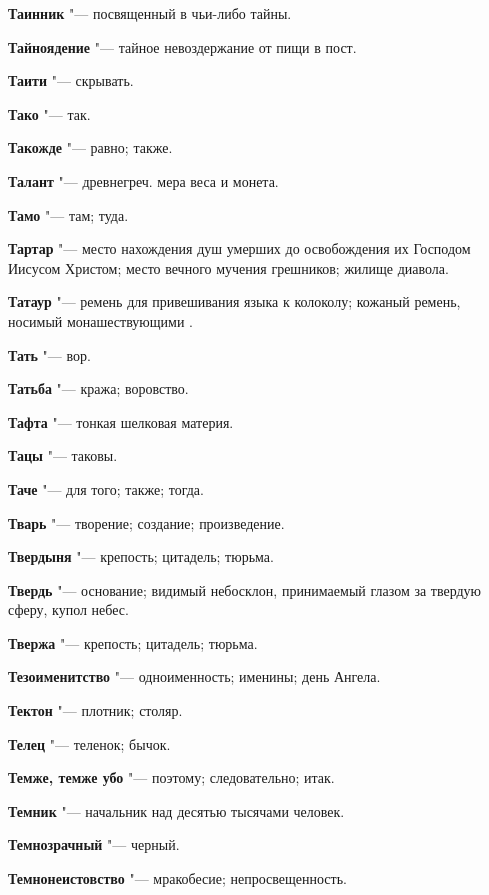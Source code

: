 \begin{mymulticols}
\noindent\textbf{Таинник} "--- посвященный в чьи-либо тайны. 

\noindent\textbf{Тайноядение} "--- тайное невоздержание от пищи в пост. 

\noindent\textbf{Таити} "--- скрывать. 

\noindent\textbf{Тако} "--- так. 

\noindent\textbf{Такожде} "--- равно; также. 

\noindent\textbf{Талант} "--- древнегреч. мера веса и монета. 

\noindent\textbf{Тамо} "--- там; туда. 

\noindent\textbf{Тартар} "--- место нахождения душ умерших до освобождения их Господом Иисусом Христом; место вечного мучения грешников; жилище диавола. 

\noindent\textbf{Татаур} "--- ремень для привешивания языка к колоколу; кожаный ремень, носимый монашествующими . 

\noindent\textbf{Тать} "--- вор. 

\noindent\textbf{Татьба} "--- кража; воровство. 

\noindent\textbf{Тафта} "--- тонкая шелковая материя. 

\noindent\textbf{Тацы} "--- таковы. 

\noindent\textbf{Таче} "--- для того; также; тогда. 

\noindent\textbf{Тварь} "--- творение; создание; произведение. 

\noindent\textbf{Твердыня} "--- крепость; цитадель; тюрьма. 

\noindent\textbf{Твердь} "--- основание; видимый небосклон, принимаемый глазом за твердую сферу, купол небес. 

\noindent\textbf{Твержа} "--- крепость; цитадель; тюрьма. 

\noindent\textbf{Тезоименитство} "--- одноименность; именины; день Ангела. 

\noindent\textbf{Тектон} "--- плотник; столяр. 

\noindent\textbf{Телец} "--- теленок; бычок. 

\noindent\textbf{Темже, темже убо} "--- поэтому; следовательно; итак. 

\noindent\textbf{Темник} "--- начальник над десятью тысячами человек. 

\noindent\textbf{Темнозрачный} "--- черный. 

\noindent\textbf{Темнонеистовство} "--- мракобесие; непросвещенность. 


\end{mymulticols}
